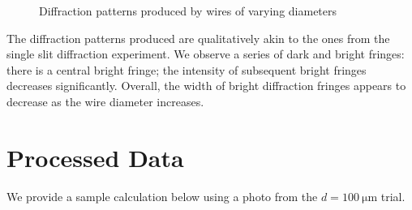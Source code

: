 \documentclass[a4paper, 12pt]{article}
\begin{document}
\begin{figure}[H]
\centering
\end{figure}
\begin{figure}[H]
\ContinuedFloat
\centering

    
    
    
    \caption{Diffraction patterns produced by wires of varying diameters}
\end{figure}

The diffraction patterns produced are qualitatively akin to the ones from the single slit diffraction experiment. 
We observe a series of dark and bright fringes: 
there is a central bright fringe; 
the intensity of subsequent bright fringes decreases significantly. 
Overall, the width of bright diffraction fringes appears to decrease as the wire diameter increases. 

\section{Processed Data}
We provide a sample calculation below using a photo from the $d = \SI{100}{\um}$ trial.
\end{document}
